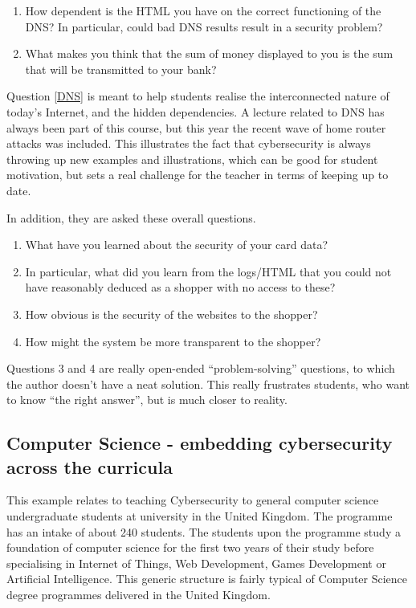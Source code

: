 \documentclass[conference]{IEEEtran}
\begin{document}
\begin{itemize}
\begin{enumerate}
\item How dependent is the HTML you have on the correct functioning of the DNS? In particular, could bad DNS results result in a security problem?\label{DNS}
\item What makes you think that the sum of money displayed to you is the sum that will be transmitted to your bank?
\end{enumerate}
Question \ref{DNS} is meant to help students realise the interconnected nature of today's Internet, and the hidden dependencies. A lecture related to DNS has always been part of this course, but this year the recent wave of home router attacks  \cite[and others]{Balaji2020a} was included. This illustrates the fact that cybersecurity is always throwing up new examples and illustrations, which can be good for student motivation, but sets a real challenge for the teacher in terms of keeping up to date.
\par
In addition, they are asked these overall questions.
\begin{enumerate}
\item What have you learned about the security of your card data?
\item In particular, what did you learn from the logs/HTML that you could not have reasonably deduced as a shopper with no access to these?
\item How obvious is the security of the websites to the shopper?
\item How might the system be more transparent to the shopper?
\end{enumerate}
Questions 3 and 4 are really open-ended ``problem-solving'' questions, to which the author doesn't have a neat solution. This really frustrates students, who want to know ``the right answer'', but is much closer to reality.
\end{itemize}

\subsection{Computer Science - embedding cybersecurity across the curricula}\label{sec:fifth} %

This example relates to teaching Cybersecurity to general computer science undergraduate students at university in the United Kingdom. The programme has an intake of about 240 students. The students upon the programme study a foundation of computer science for the first two years of their study before specialising in Internet of Things,  Web Development, Games Development or Artificial Intelligence. This generic structure is fairly typical of Computer Science degree programmes delivered in the United Kingdom.
\end{document}
